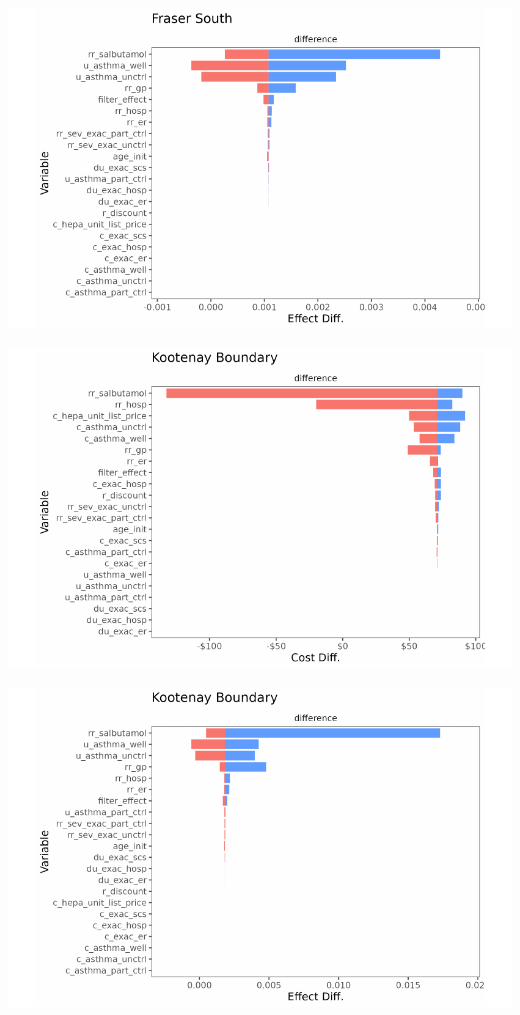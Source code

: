 \documentclass[
  number]{elsarticle}
\begin{document}
\includegraphics{index_files/figure-pdf/unnamed-chunk-9-10.pdf}

\includegraphics{index_files/figure-pdf/unnamed-chunk-9-11.pdf}

\includegraphics{index_files/figure-pdf/unnamed-chunk-9-12.pdf}
\end{document}
